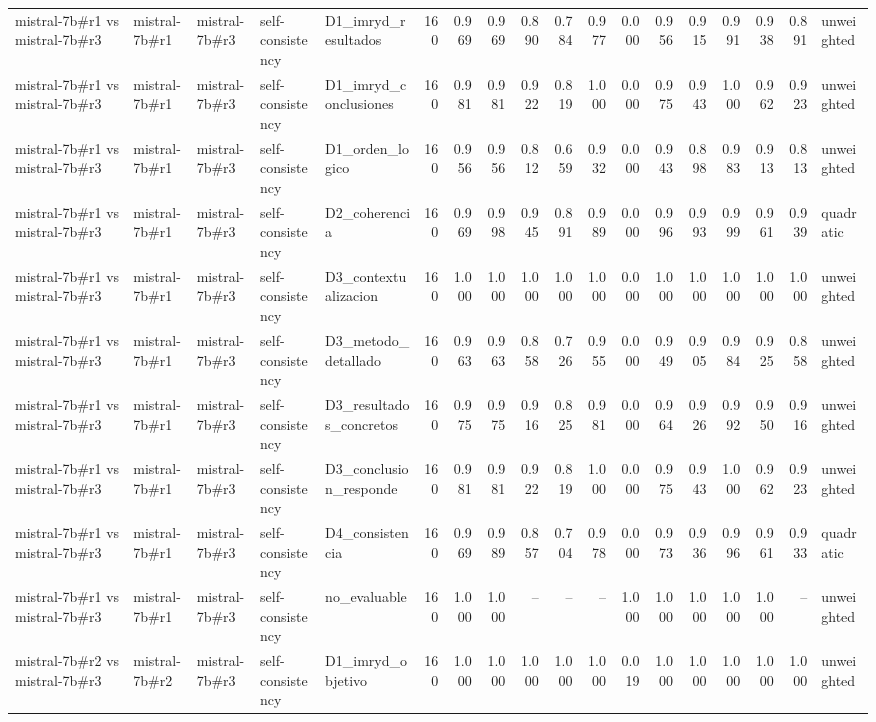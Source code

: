 \begin{table}
{\begin{tabular}{lllllrrrrrrrrrrrrl}
mistral-7b\#r1 vs mistral-7b\#r3 & mistral-7b\#r1 & mistral-7b\#r3 & self-consistency & D1\_imryd\_resultados & 160 & 0.969 & 0.969 & 0.890 & 0.784 & 0.977 & 0.000 & 0.956 & 0.915 & 0.991 & 0.938 & 0.891 & unweighted \\
mistral-7b\#r1 vs mistral-7b\#r3 & mistral-7b\#r1 & mistral-7b\#r3 & self-consistency & D1\_imryd\_conclusiones & 160 & 0.981 & 0.981 & 0.922 & 0.819 & 1.000 & 0.000 & 0.975 & 0.943 & 1.000 & 0.962 & 0.923 & unweighted \\
mistral-7b\#r1 vs mistral-7b\#r3 & mistral-7b\#r1 & mistral-7b\#r3 & self-consistency & D1\_orden\_logico & 160 & 0.956 & 0.956 & 0.812 & 0.659 & 0.932 & 0.000 & 0.943 & 0.898 & 0.983 & 0.913 & 0.813 & unweighted \\
mistral-7b\#r1 vs mistral-7b\#r3 & mistral-7b\#r1 & mistral-7b\#r3 & self-consistency & D2\_coherencia & 160 & 0.969 & 0.998 & 0.945 & 0.891 & 0.989 & 0.000 & 0.996 & 0.993 & 0.999 & 0.961 & 0.939 & quadratic \\
mistral-7b\#r1 vs mistral-7b\#r3 & mistral-7b\#r1 & mistral-7b\#r3 & self-consistency & D3\_contextualizacion & 160 & 1.000 & 1.000 & 1.000 & 1.000 & 1.000 & 0.000 & 1.000 & 1.000 & 1.000 & 1.000 & 1.000 & unweighted \\
mistral-7b\#r1 vs mistral-7b\#r3 & mistral-7b\#r1 & mistral-7b\#r3 & self-consistency & D3\_metodo\_detallado & 160 & 0.963 & 0.963 & 0.858 & 0.726 & 0.955 & 0.000 & 0.949 & 0.905 & 0.984 & 0.925 & 0.858 & unweighted \\
mistral-7b\#r1 vs mistral-7b\#r3 & mistral-7b\#r1 & mistral-7b\#r3 & self-consistency & D3\_resultados\_concretos & 160 & 0.975 & 0.975 & 0.916 & 0.825 & 0.981 & 0.000 & 0.964 & 0.926 & 0.992 & 0.950 & 0.916 & unweighted \\
mistral-7b\#r1 vs mistral-7b\#r3 & mistral-7b\#r1 & mistral-7b\#r3 & self-consistency & D3\_conclusion\_responde & 160 & 0.981 & 0.981 & 0.922 & 0.819 & 1.000 & 0.000 & 0.975 & 0.943 & 1.000 & 0.962 & 0.923 & unweighted \\
mistral-7b\#r1 vs mistral-7b\#r3 & mistral-7b\#r1 & mistral-7b\#r3 & self-consistency & D4\_consistencia & 160 & 0.969 & 0.989 & 0.857 & 0.704 & 0.978 & 0.000 & 0.973 & 0.936 & 0.996 & 0.961 & 0.933 & quadratic \\
mistral-7b\#r1 vs mistral-7b\#r3 & mistral-7b\#r1 & mistral-7b\#r3 & self-consistency & no\_evaluable & 160 & 1.000 & 1.000 & -- & -- & -- & 1.000 & 1.000 & 1.000 & 1.000 & 1.000 & -- & unweighted \\
mistral-7b\#r2 vs mistral-7b\#r3 & mistral-7b\#r2 & mistral-7b\#r3 & self-consistency & D1\_imryd\_objetivo & 160 & 1.000 & 1.000 & 1.000 & 1.000 & 1.000 & 0.019 & 1.000 & 1.000 & 1.000 & 1.000 & 1.000 & unweighted \\

\end{tabular}}
\end{table}
